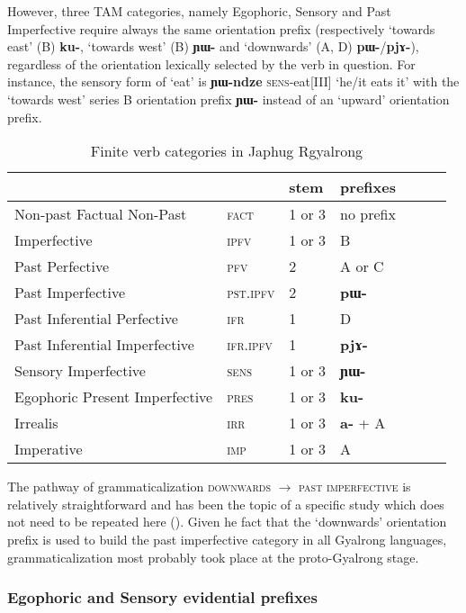 \documentclass[oldfontcommands,oneside,a4paper,11pt]{article}
\newcommand{\ipa}[1]{\mbox{\phon\textbf{#1}}} %
\begin{document}
However, three TAM categories, namely Egophoric, Sensory and Past Imperfective require always the same orientation prefix (respectively `towards east' (B) \ipa{ku-}, `towards west' (B) \ipa{ɲɯ-} and `downwards' (A, D) \ipa{pɯ-}/\ipa{pjɤ-}), regardless of the orientation lexically selected by the verb in question. For instance, the sensory form of `eat' is \ipa{ɲɯ-ndze} \textsc{sens}-eat[III] `he/it eats it' with the `towards west' series B orientation prefix \ipa{ɲɯ-} instead of an `upward' orientation prefix.

\begin{table}[H]
\caption{Finite verb categories in Japhug Rgyalrong} \label{tab:finite.forms} \centering
\begin{tabular}{lllllll}
\toprule
&	&	stem&	prefixes\\
\midrule
Non-past Factual Non-Past&	\textsc{fact} &	1 or 3&	no prefix\\
Imperfective&	\textsc{ipfv} &	1 or 3&	B\\
Past Perfective &	\textsc{pfv} &	2&	A or C\\
Past Imperfective &	\textsc{pst.ipfv} &	2&	\ipa{pɯ-}\\
Past Inferential Perfective &	\textsc{ifr} &	1&	D\\
Past Inferential Imperfective&	\textsc{ifr.ipfv} &	1&	\ipa{pjɤ-}\\
Sensory Imperfective&	\textsc{sens} &	1 or 3&	\ipa{ɲɯ-}\\
Egophoric Present Imperfective&	\textsc{pres} &	1 or 3&	\ipa{ku-}\\
Irrealis&	\textsc{irr} &	1 or 3&	\ipa{a-} + A\\
Imperative&	\textsc{imp} &	1 or 3&	A\\
\bottomrule
\end{tabular}
\end{table}

The pathway of grammaticalization \textsc{downwards} $\rightarrow $ \textsc{past imperfective} is relatively straightforward and has been the topic of a specific study which does not need to be repeated here (\citealt{lin11direction}). Given he fact that the `downwards' orientation prefix is used to build the past imperfective category in all Gyalrong languages, grammaticalization most probably took place at the proto-Gyalrong stage.

\subsubsection{Egophoric and Sensory evidential prefixes} \label{sec:egoph}
\end{document}
